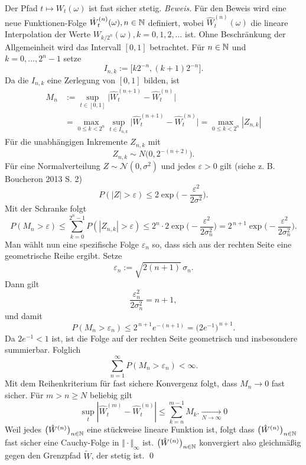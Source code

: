 \begin{satz}
Der Pfad $t \mapsto W_t(\omega)$ ist fast sicher stetig.
\textit{Beweis.}
Für den Beweis wird eine neue Funktionen-Folge $\hat W_t^{(n)}(\omega), n \in \Bbb N$
definiert, wobei $\hat W_t^{(n)}(\omega)$ die lineare Interpolation der Werte $W_{k/2^n}(\omega), k=0,1,2,\ldots$ ist. 
Ohne Beschränkung der Allgemeinheit wird das Intervall $[0,1]$ betrachtet. Für $n \in \Bbb N$ und $k=0,\dots,2^n-1$ setze
$$I_{n,k}:=\big[k2^{-n},(k+1)2^{-n}\big].$$
Da die $I_{n,k}$ eine Zerlegung von $[0,1]$ bilden, ist
$$
\begin{aligned}
M_n &:=\sup_{t\in[0,1]}\big|\hat W^{(n+1)}_t-\hat W^{(n)}_t\big| 
\\ &= \max_{0\le k<2^n} \sup_{t\in I_{n,k}} \big|\hat W^{(n+1)}_t-\hat W^{(n)}_t\big| =\max_{0\le k<2^n}|Z_{n,k}|
\end{aligned}
$$
Für die unabhängigen Inkremente $Z_{n,k}$ mit
$$
Z_{n,k}\sim N\!\big(0,2^{-(n+2)}\big).
$$
Für eine Normalverteilung $Z\sim \mathcal N(0,\sigma^2)$ und jedes $\varepsilon>0$ gilt (siehe z. B. Boucheron 2013 \cite{boucheron_concentration_2013} S. 2)
$$
P(|Z| >\varepsilon) \le 2\exp\!\Big(-\frac{\varepsilon^2}{2\sigma^2}\Big).
$$
Mit der Schranke folgt
$$
P(M_n>\varepsilon) \le \sum_{k=0}^{2^n-1} P(|Z_{n,k}|>\varepsilon)
\le 2^n\cdot 2\exp\!\Big(-\frac{\varepsilon^2}{2\sigma_n^2}\Big)
= 2^{\,n+1}\exp\!\Big(-\frac{\varepsilon^2}{2\sigma_n^2}\Big).
$$
Man wählt nun eine spezifische Folge $\varepsilon_n$ so, dass sich aus der rechten Seite eine geometrische Reihe ergibt. Setze
$$
\varepsilon_n := \sqrt{2(n+1)}\,\sigma_n.
$$
Dann gilt
$$
\frac{\varepsilon_n^2}{2\sigma_n^2}=n+1,
$$
und damit
$$
P(M_n>\varepsilon_n)\le 2^{\,n+1} e^{-(n+1)} = \big(2e^{-1}\big)^{\,n+1}.
$$
Da $2e^{-1}<1$ ist, ist die Folge auf der rechten Seite geometrisch und insbesondere summierbar. Folglich
$$
\sum_{n=1}^\infty P(M_n>\varepsilon_n) < \infty.
$$
Mit dem Reihenkriterium für fast sichere Konvergenz folgt, dass $M_n\to 0$ fast sicher.
Für $m \gt n \ge N$ beliebig gilt
$$\sup_{t}|\hat W^{(m)}_t - \hat W^{(n)}_t| \leq \sum_{k=n}^{m-1} M_k. \underset{N \to \infty} \longrightarrow 0$$
Weil jedes $\big(\hat W^{(n)}\big)_{n\in\Bbb N}$ eine stückweise lineare Funktion ist, folgt
dass $\big(\hat W^{(n)}\big)_{n\in\Bbb N}$ fast sicher eine Cauchy-Folge in $\Vert \cdot \Vert_{\infty}$ ist.
$\big(\hat W^{(n)}\big)_{n\in\Bbb N}$ konvergiert also gleichmäßig gegen den Grenzpfad $\widetilde W$, der stetig ist. \qed

\end{satz}

\newpage